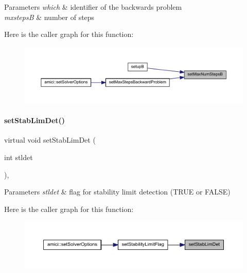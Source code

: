 \begin{DoxyParams}{Parameters}
{\em which} & identifier of the backwards problem \\
\hline
{\em mxstepsB} & number of steps \\
\hline
\end{DoxyParams}
Here is the caller graph for this function\+:
\nopagebreak
\begin{figure}[H]
\begin{center}
\leavevmode
\includegraphics[width=350pt]{classamici_1_1_solver_a1163fddb222195354bdcf306fc52a1d0_icgraph}
\end{center}
\end{figure}
\mbox{\label{classamici_1_1_solver_a040fb365c47a8e8ccc1f32021b38bfcb}} 
\paragraph{\texorpdfstring{setStabLimDet()}{setStabLimDet()}}
{\footnotesize\ttfamily virtual void set\+Stab\+Lim\+Det (\begin{DoxyParamCaption}\item[{int}]{stldet }\end{DoxyParamCaption})\hspace{0.3cm}{\ttfamily [protected]}, {}}


\begin{DoxyParams}{Parameters}
{\em stldet} & flag for stability limit detection (T\+R\+UE or F\+A\+L\+SE) \\
\hline
\end{DoxyParams}
Here is the caller graph for this function\+:
\nopagebreak
\begin{figure}[H]
\begin{center}
\leavevmode
\includegraphics[width=350pt]{classamici_1_1_solver_a040fb365c47a8e8ccc1f32021b38bfcb_icgraph}
\end{center}
\end{figure}
\mbox{\label{classamici_1_1_solver_acb7f8ad7671faf5fa7e5fa7851e662ec}} 
